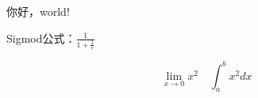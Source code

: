\documentclass[UTF8]{ctexart}
\begin{document}
你好，world!  

Sigmod公式：$\frac{1}{1+\frac{1}{e}}$  

\[ \lim_{x\to0}x^2 \quad \int_a^b x^2 dx \]
\end{document}
